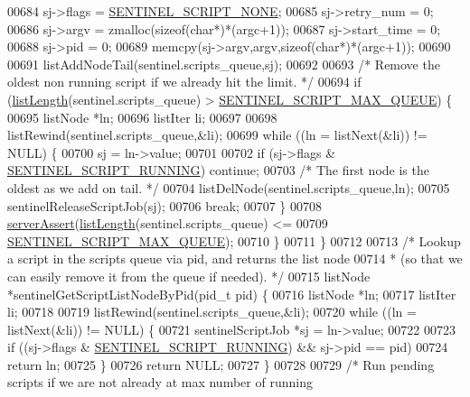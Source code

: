 \begin{DoxyCode}
{{{{{{{{{{00684     sj->flags = \hyperlink{sentinel_8c_a31022e5665e3f4a0a99254e5660e155a}{SENTINEL\_SCRIPT\_NONE};
00685     sj->retry\_num = 0;
00686     sj->argv = zmalloc(\textcolor{keyword}{sizeof}(\textcolor{keywordtype}{char}*)*(argc+1));
00687     sj->start\_time = 0;
00688     sj->pid = 0;
00689     memcpy(sj->argv,argv,\textcolor{keyword}{sizeof}(\textcolor{keywordtype}{char}*)*(argc+1));
00690 
00691     listAddNodeTail(sentinel.scripts\_queue,sj);
00692 
00693     \textcolor{comment}{/* Remove the oldest non running script if we already hit the limit. */}
00694     \textcolor{keywordflow}{if} (\hyperlink{adlist_8h_afde0ab079f934670e82119b43120e94b}{listLength}(sentinel.scripts\_queue) > 
      \hyperlink{sentinel_8c_a43203051dc0534d7c1a69ea7a4848333}{SENTINEL\_SCRIPT\_MAX\_QUEUE}) \{
00695         listNode *ln;
00696         listIter li;
00697 
00698         listRewind(sentinel.scripts\_queue,&li);
00699         \textcolor{keywordflow}{while} ((ln = listNext(&li)) != NULL) \{
00700             sj = ln->value;
00701 
00702             \textcolor{keywordflow}{if} (sj->flags & \hyperlink{sentinel_8c_a0211d42099c07769ec06cc0010f9b58e}{SENTINEL\_SCRIPT\_RUNNING}) \textcolor{keywordflow}{continue};
00703             \textcolor{comment}{/* The first node is the oldest as we add on tail. */}
00704             listDelNode(sentinel.scripts\_queue,ln);
00705             sentinelReleaseScriptJob(sj);
00706             \textcolor{keywordflow}{break};
00707         \}
00708         \hyperlink{server_8h_a88114b5169b4c382df6b56506285e56a}{serverAssert}(\hyperlink{adlist_8h_afde0ab079f934670e82119b43120e94b}{listLength}(sentinel.scripts\_queue) <=
00709                     \hyperlink{sentinel_8c_a43203051dc0534d7c1a69ea7a4848333}{SENTINEL\_SCRIPT\_MAX\_QUEUE});
00710     \}
00711 \}
00712 
00713 \textcolor{comment}{/* Lookup a script in the scripts queue via pid, and returns the list node}
00714 \textcolor{comment}{ * (so that we can easily remove it from the queue if needed). */}
00715 listNode *sentinelGetScriptListNodeByPid(pid\_t pid) \{
00716     listNode *ln;
00717     listIter li;
00718 
00719     listRewind(sentinel.scripts\_queue,&li);
00720     \textcolor{keywordflow}{while} ((ln = listNext(&li)) != NULL) \{
00721         sentinelScriptJob *sj = ln->value;
00722 
00723         \textcolor{keywordflow}{if} ((sj->flags & \hyperlink{sentinel_8c_a0211d42099c07769ec06cc0010f9b58e}{SENTINEL\_SCRIPT\_RUNNING}) && sj->pid == pid)
00724             \textcolor{keywordflow}{return} ln;
00725     \}
00726     \textcolor{keywordflow}{return} NULL;
00727 \}
00728 
00729 \textcolor{comment}{/* Run pending scripts if we are not already at max number of running}
}}}}}}}}}}
\end{DoxyCode}
